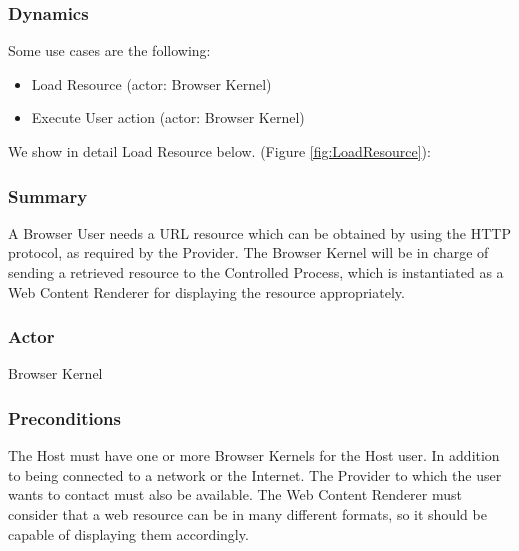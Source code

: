 \documentclass{sig-alternate-05-2015}
\begin{document}
    \subsubsection*{Dynamics}
    Some use cases are the following:
    \begin{itemize}
      \item Load Resource (actor: Browser Kernel)

      \item Execute User action (actor: Browser Kernel)

    \end{itemize}
    We show in detail Load Resource below. (Figure \ref{fig:LoadResource}):
    \subsubsection*{Summary} A Browser User needs a URL resource which can be obtained by using the HTTP protocol, as required by the Provider. The Browser Kernel will be in charge of sending a retrieved resource to the Controlled Process, which is instantiated as a Web Content Renderer for displaying the resource appropriately.
    \subsubsection*{Actor} Browser Kernel
    \subsubsection*{Preconditions} The Host must have one or more Browser Kernels for the Host user. In addition to being connected to a network or the Internet. The Provider to which the user wants to contact must also be available. The Web Content Renderer must consider that a web resource can be in many different formats, so it should be capable of displaying them accordingly.
\end{document}
